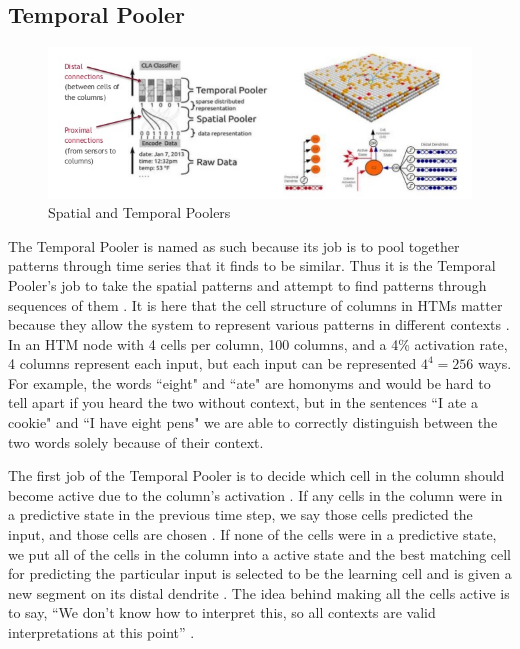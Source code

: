 \documentclass[fleqn,notitlepage,minimal]{article}
\begin{document}
	
	\subsection{Temporal Pooler}
	
	\begin{figure}[h!]
		\centering
		\includegraphics[width=\linewidth]{images/Poolers.jpg}
		\caption{Spatial and Temporal Poolers}
		\label{fig 2}
	\end{figure}
	
	The Temporal Pooler is named as such because its job is to pool together patterns through time series that it finds to be similar. Thus it is the Temporal Pooler's job to take the spatial patterns and attempt to find patterns through sequences of them \cite{Principles}. It is here that the cell structure of columns in HTMs matter because they allow the system to represent various patterns in different contexts \cite{Principles}. In an HTM node with 4 cells per column, 100 columns, and a 4\% activation rate, 4 columns represent each input, but each input can be represented $4^{4}=256$ ways. For example, the words ``eight" and ``ate" are homonyms and would be hard to tell apart if you heard the two without context, but in the sentences ``I ate a cookie" and ``I have eight pens" we are able to correctly distinguish between the two words solely because of their context.
	
	The first job of the Temporal Pooler is to decide which cell in the column should become active due to the column's activation \cite{Principles}. If any cells in the column were in a predictive state in the previous time step, we say those cells predicted the input, and those cells are chosen \cite{Whitepaper}. If none of the cells were in a predictive state, we put all of the cells in the column into a active state and the best matching cell for predicting the particular input is selected to be the learning cell and is given a new segment on its distal dendrite \cite{Whitepaper}. The idea behind making all the cells active is to say, ``We don't know how to interpret this, so all contexts are valid interpretations at this point'' \cite{Principles}.
	
\end{document}

